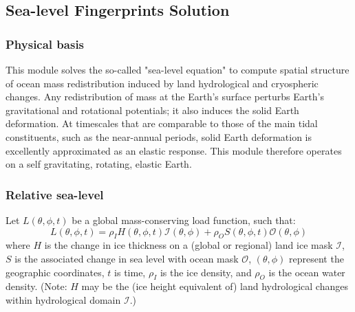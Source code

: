 
\subsection{Sea-level Fingerprints Solution} \label{sec:using-issm-capabilities-slr}
\subsubsection{Physical basis}
This module solves the so-called "sea-level equation" to compute spatial structure of ocean mass redistribution induced by land hydrological and cryospheric changes. Any redistribution of mass at the Earth's surface perturbs Earth's gravitational and rotational potentials; it also induces the solid Earth deformation. At timescales that are comparable to those of the main tidal constituents, such as the near-annual periods, solid Earth deformation is excellently approximated as an elastic response. This module therefore operates on a self gravitating, rotating, elastic Earth.

\subsubsection{Relative sea-level}
Let $L(\theta,\phi,t)$ be a global mass-conserving load function, such that:
\begin{equation}
	L(\theta,\phi,t) = \rho_I H(\theta,\phi,t) \mathcal{I}(\theta,\phi) + \rho_O S(\theta,\phi,t)
	\mathcal{O}(\theta,\phi)
\end{equation}
where $H$ is the change in ice thickness on a (global or regional) land ice mask $\mathcal{I}$, $S$ is the associated change in sea level with ocean mask $\mathcal{O}$, $(\theta,\phi)$ represent the geographic coordinates, $t$ is time, $\rho_I$ is the ice density, and $\rho_O$ is the ocean water density. (Note: $H$ may be the (ice height equivalent of) land hydrological changes within hydrological domain $\mathcal{I}$.)

